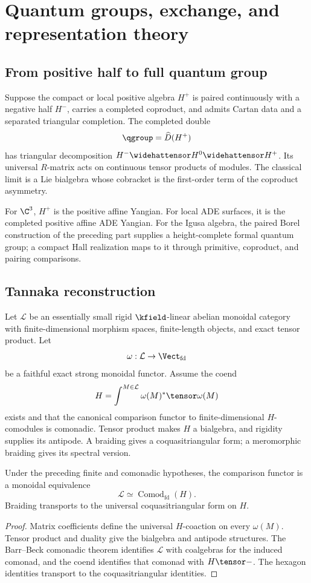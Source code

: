 \part{Quantum groups, exchange, and representation theory}

\chapter{From positive half to full quantum group}
Suppose the compact or local positive algebra $H^+$ is paired continuously with a negative half $H^-$, carries a completed coproduct, and admits Cartan data and a separated triangular completion. The completed double
\[
 \qgroup=\widehat D(H^+)
\]
has triangular decomposition $H^-\widehattensor H^0\widehattensor H^+$. Its universal $R$-matrix acts on continuous tensor products of modules. The classical limit is a Lie bialgebra whose cobracket is the first-order term of the coproduct asymmetry.

For $\C^3$, $H^+$ is the positive affine Yangian. For local ADE surfaces, it is the completed positive affine ADE Yangian. For the Igusa algebra, the paired Borel construction of the preceding part supplies a height-complete formal quantum group; a compact Hall realization maps to it through primitive, coproduct, and pairing comparisons.

\chapter{Tannaka reconstruction}
Let $\mathcal L$ be an essentially small rigid $\kfield$-linear abelian monoidal category with finite-dimensional morphism spaces, finite-length objects, and exact tensor product. Let
\[
 \omega:\mathcal L\to\Vect_{\mathrm{fd}}
\]
be a faithful exact strong monoidal functor. Assume the coend
\[
 H=\int^{M\in\mathcal L}\omega(M)^*\tensor\omega(M)
\]
exists and that the canonical comparison functor to finite-dimensional $H$-comodules is comonadic. Tensor product makes $H$ a bialgebra, and rigidity supplies its antipode. A braiding gives a coquasitriangular form; a meromorphic braiding gives its spectral version.

\begin{theorem}
Under the preceding finite and comonadic hypotheses, the comparison functor is a monoidal equivalence
\[
 \mathcal L\simeq\operatorname{Comod}_{\mathrm{fd}}(H).
\]
Braiding transports to the universal coquasitriangular form on $H$.
\end{theorem}
\begin{proof}
Matrix coefficients define the universal $H$-coaction on every $\omega(M)$. Tensor product and duality give the bialgebra and antipode structures. The Barr--Beck comonadic theorem identifies $\mathcal L$ with coalgebras for the induced comonad, and the coend identifies that comonad with $H\tensor-$. The hexagon identities transport to the coquasitriangular identities.
\end{proof}

